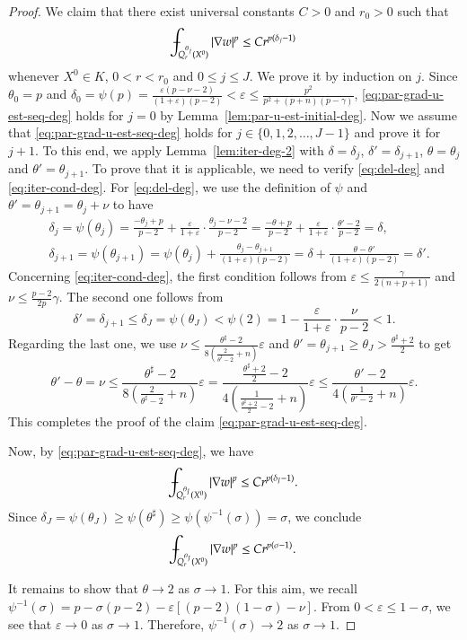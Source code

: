 \documentclass[11pt,oneside,english]{amsart}
\newcommand{\e}{\varepsilon}
\newcommand{\de}{\delta}
\newcommand{\D}{\nabla}
\numberwithin{equation}{section}
\def\Xint#1{\mathchoice
  {\XXint\displaystyle\textstyle{#1}}%
  {\XXint\textstyle\scriptstyle{#1}}%
  {\XXint\scriptstyle\scriptscriptstyle{#1}}%
  {\XXint\scriptscriptstyle\scriptscriptstyle{#1}}%
  \!\int}
\def\XXint#1#2#3{{\setbox0=\hbox{$#1{#2#3}{\int}$}
    \vcenter{\hbox{$#2#3$}}\kern-.5\wd0}}
\def\dashint{\Xint-}
\theoremstyle{plain}
\numberwithin{equation}{section}
\begin{document}
\begin{proof}
We claim that there exist universal constants $C>0$ and $r_0>0$ such that
\begin{align}
    \label{eq:par-grad-u-est-seq-deg}
    \dashint_{Q_r^{\theta_j}(X^0)}|\D w|^p\le Cr^{p(\de_j-1)}
\end{align}
whenever $X^0\in K$, $0<r<r_0$ and $0\le j\le J$. We prove it by induction on $j$. Since $\theta_0=p$ and $\de_0=\psi(p)=\frac{\e(p-\nu-2)}{(1+\e)(p-2)}<\e\le \frac{p^2}{p^2+(p+n)(p-\gamma) }$, \eqref{eq:par-grad-u-est-seq-deg} holds for $j=0$ by Lemma~\ref{lem:par-u-est-initial-deg}. Now we assume that \eqref{eq:par-grad-u-est-seq-deg} holds for $j\in \{0,1,2,\ldots,J-1\}$ and prove it for $j+1$. To this end, we apply Lemma~\ref{lem:iter-deg-2} with $\de=\de_j$, $\de'=\de_{j+1}$, $\theta=\theta_j$ and $\theta'=\theta_{j+1}$. To prove that it is applicable, we need to verify \eqref{eq:del-deg} and \eqref{eq:iter-cond-deg}. For \eqref{eq:del-deg}, we use the definition of $\psi$ and $\theta'=\theta_{j+1}=\theta_j+\nu$ to have
\begin{align*}
    &\de_j=\psi(\theta_j)=\frac{-\theta_j+p}{p-2}+\frac{\e}{1+\e}\cdot\frac{\theta_j-\nu-2}{p-2}=\frac{-\theta+p}{p-2}+\frac{\e}{1+\e}\cdot\frac{\theta'-2}{p-2}=\de,\\
    &\de_{j+1}=\psi(\theta_{j+1})=\psi(\theta_j)+\frac{\theta_{j}-\theta_{j+1}}{(1+\e)(p-2)}=\de+\frac{\theta-\theta'}{(1+\e)(p-2)}=\de'.
\end{align*}
Concerning \eqref{eq:iter-cond-deg}, the first condition follows from $\e\le \frac{\gamma}{2(n+p+1)}$  and $\nu\le \frac{p-2}{2p}\gamma$. The second one follows from 
$$
\de'=\de_{j+1}\le \de_J=\psi(\theta_J)<\psi(2)=1-\frac{\e}{1+\e}\cdot\frac{\nu}{p-2}<1.
$$
Regarding the last one, we use $\nu\le\frac{\theta^\sharp-2 }{8\left(\frac{2}{\theta^\sharp-2}+n \right) }\e$ and $\theta'=\theta_{j+1}\ge \theta_J>\frac{\theta^\sharp+2}2$ to get
$$
\theta'-\theta=\nu\le \frac{\theta^\sharp-2 }{8\left(\frac{2}{\theta^\sharp-2}+n \right) }\e=\frac{\frac{\theta^\sharp +2}2-2 }{4\left(\frac1{\frac{\theta^\sharp+2}{2}-2 }+n \right) }\e\le \frac{\theta'-2 }{4\left(\frac1{\theta'-2}+n \right) }\e .
$$
This completes the proof of the claim \eqref{eq:par-grad-u-est-seq-deg}.

Now, by \eqref{eq:par-grad-u-est-seq-deg}, we have
$$
\dashint_{Q_r^{\theta_J}(X^0)}|\D w|^p\le Cr^{p(\de_J-1)}.
$$
Since $\de_J=\psi(\theta_J)\ge \psi(\theta^\sharp)\ge \psi(\psi^{-1}(\sigma))=\sigma$, we conclude
$$
\dashint_{Q_r^{\theta_J}(X^0)}|\D w|^p\le Cr^{p(\sigma-1)}.
$$

 It remains to show that $\theta\to 2$ as $\sigma\to1$. For this aim, we recall $\psi^{-1}(\sigma)=p-\sigma(p-2)-\e[(p-2)(1-\sigma)-\nu]$. From $0<\e\le 1-\sigma$, we see that $\e\to0$ as $\sigma\to1$. Therefore, $\psi^{-1}(\sigma)\to2$ as $\sigma\to1$. 
\end{proof}
\end{document}
